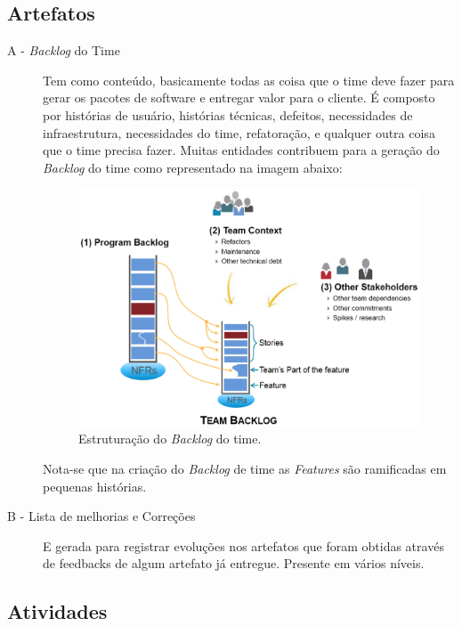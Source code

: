   \subsection{Artefatos}

\begin{description}
  \item[A - \textit{Backlog} do Time]
  Tem como conteúdo, basicamente todas as coisa que o time deve fazer para gerar
  os pacotes de software e entregar valor para o cliente. É composto por histórias
  de usuário, histórias técnicas, defeitos, necessidades de infraestrutura, necessidades
  do time, refatoração, e qualquer outra coisa que o time precisa fazer. Muitas entidades
  contribuem para a geração do \textit{Backlog} do time como representado na imagem abaixo:

  \begin{figure}[H]
      \centering
    \includegraphics[keepaspectratio=true,scale=0.3]{figuras/TeamBacklog.eps}
      \caption{Estruturação do \textit{Backlog} do time.}
      \label{fig:backlog}
  \end{figure}

  Nota-se que na criação do \textit{Backlog} de time as \textit{Features}  são ramificadas em pequenas histórias.


  \item[B - Lista de melhorias e Correções]
   E gerada para registrar evoluções nos artefatos que foram obtidas através de feedbacks
  de algum artefato já entregue. Presente em vários níveis.

\end{description}


  \subsection{Atividades}


